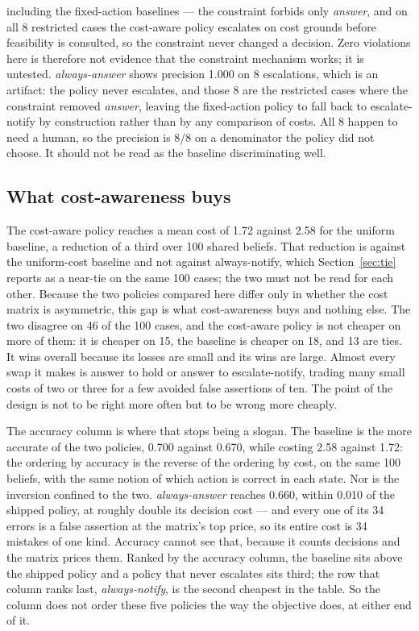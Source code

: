 \documentclass{article}
\begin{document}
\begin{table}[t]
{including the fixed-action baselines --- the constraint forbids only \emph{answer},
and on all 8 restricted cases the cost-aware policy escalates on cost grounds before
feasibility is consulted, so the constraint never changed a decision. Zero violations
here is therefore not evidence that the constraint mechanism works; it is untested.
\emph{always-answer} shows precision 1.000 on 8 escalations, which is an artifact:
the policy never escalates, and those 8 are the restricted cases where the
constraint removed \emph{answer}, leaving the fixed-action policy to fall back to
escalate-notify by construction rather than by any comparison of costs. All
8 happen to need a human, so the precision is 8/8 on a denominator the policy did
not choose. It should not be read as the baseline discriminating well.}
\label{tab:results}
\end{table}

\subsection{What cost-awareness buys}
The cost-aware policy reaches a mean cost of 1.72 against 2.58 for the uniform
baseline, a reduction of a third over 100 shared beliefs. That reduction is
against the uniform-cost baseline and not against always-notify, which
Section~\ref{sec:tie} reports as a near-tie on the same 100 cases; the two must
not be read for each other. Because the two policies compared here differ only in
whether the cost matrix is asymmetric, this gap is what cost-awareness buys and
nothing else. The two disagree on 46 of the 100 cases,
and the cost-aware policy is not cheaper on more of them: it is cheaper on 15,
the baseline is cheaper on 18, and 13 are ties. It wins overall because its
losses are small and its wins are large. Almost every swap it makes is answer to
hold or answer to escalate-notify, trading many small costs of two or three for a
few avoided false assertions of ten. The point of the design is not to be right
more often but to be wrong more cheaply.

The accuracy column is where that stops being a slogan. The baseline is the more
accurate of the two policies, 0.700 against 0.670, while costing 2.58 against 1.72:
the ordering by accuracy is the reverse of the ordering by cost, on the same 100
beliefs, with the same notion of which action is correct in each state. Nor is the
inversion confined to the two. \emph{always-answer} reaches 0.660, within 0.010 of the
shipped policy, at roughly double its decision cost --- and every one of its 34
errors is a false assertion at the matrix's top price, so its entire cost is 34
mistakes of one kind. Accuracy cannot see that, because it counts decisions and the
matrix prices them. Ranked by the accuracy column, the baseline sits above the shipped
policy and a policy that never escalates sits third; the row that column ranks last,
\emph{always-notify}, is the second cheapest in the table. So the column does not
order these five policies the way the objective does, at either end of it.
\end{document}
